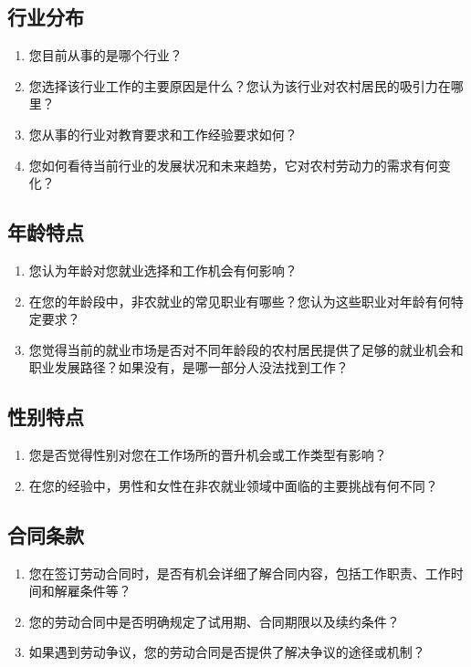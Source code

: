 \documentclass[12pt]{article}
\begin{document}
\subsection*{行业分布}
\begin{enumerate}
    \item 您目前从事的是哪个行业？
    \item 您选择该行业工作的主要原因是什么？您认为该行业对农村居民的吸引力在哪里？
    \item 您从事的行业对教育要求和工作经验要求如何？
    \item 您如何看待当前行业的发展状况和未来趋势，它对农村劳动力的需求有何变化？
\end{enumerate}

\subsection*{年龄特点}
\begin{enumerate}
    \item 您认为年龄对您就业选择和工作机会有何影响？
    \item 在您的年龄段中，非农就业的常见职业有哪些？您认为这些职业对年龄有何特定要求？
    \item 您觉得当前的就业市场是否对不同年龄段的农村居民提供了足够的就业机会和职业发展路径？如果没有，是哪一部分人没法找到工作？
\end{enumerate}

\subsection*{性别特点}
\begin{enumerate}
    \item 您是否觉得性别对您在工作场所的晋升机会或工作类型有影响？
    \item 在您的经验中，男性和女性在非农就业领域中面临的主要挑战有何不同？
\end{enumerate}

\subsection*{合同条款}
\begin{enumerate}
    \item 您在签订劳动合同时，是否有机会详细了解合同内容，包括工作职责、工作时间和解雇条件等？
    \item 您的劳动合同中是否明确规定了试用期、合同期限以及续约条件？
    \item 如果遇到劳动争议，您的劳动合同是否提供了解决争议的途径或机制？
\end{enumerate}
\end{document}
